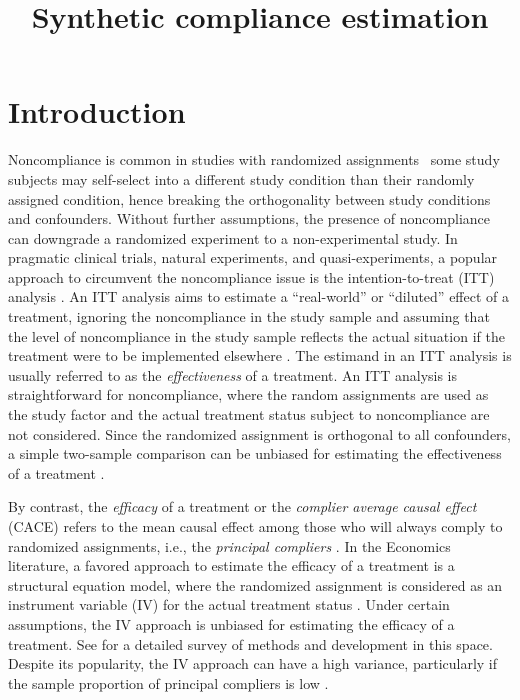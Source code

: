 \documentclass{article}
\title{Synthetic compliance estimation}
\begin{document}
\maketitle

\section{Introduction}
Noncompliance is common in studies with randomized assignments \textemdash ~some study subjects may self-select into a different study condition than their randomly assigned condition, hence breaking the orthogonality between study conditions and confounders.  Without further assumptions, the presence of noncompliance can downgrade a randomized experiment to a non-experimental study.  In pragmatic clinical trials, natural experiments, and quasi-experiments, a popular approach to circumvent the noncompliance issue is the intention-to-treat (ITT) analysis \citep{roland1998understanding, hollis1999meant, heckman2001policy}.  An ITT analysis aims to estimate a ``real-world'' or ``diluted'' effect of a treatment, ignoring the noncompliance in the study sample and assuming that the level of noncompliance in the study sample reflects the actual situation if the treatment were to be implemented elsewhere \citep{ten2008intent}.  The estimand in an ITT analysis is usually referred to as the \textit{effectiveness} of a treatment.  
An ITT analysis is straightforward for noncompliance, where the random assignments are used as the study factor and the actual treatment status subject to noncompliance are not considered.  Since the randomized assignment is orthogonal to all confounders, a simple two-sample comparison can be unbiased for estimating the effectiveness of a treatment \citep{angrist1999empirical, little2009comparison}. 

By contrast, the \textit{efficacy} of a treatment or the \textit{complier average causal effect} (CACE) refers to the mean causal effect among those who will always comply to randomized assignments, i.e., the \textit{principal compliers} \citep{angrist1996identification, little2009comparison}.  In the Economics literature, a favored approach to estimate the efficacy of a treatment is a structural equation model, where the randomized assignment is considered as an instrument variable (IV) for the actual treatment status \citep{greene2003econometric}.  Under certain assumptions, the IV approach is unbiased for estimating the efficacy of a treatment.   See \citep{imbens2014instrumental} for a detailed survey of methods and development in this space. Despite its popularity, the IV approach can have a high variance, particularly if the sample proportion of principal compliers is low \citep{little2009comparison, antonelli2017synthetic}.
 	
\end{document}
